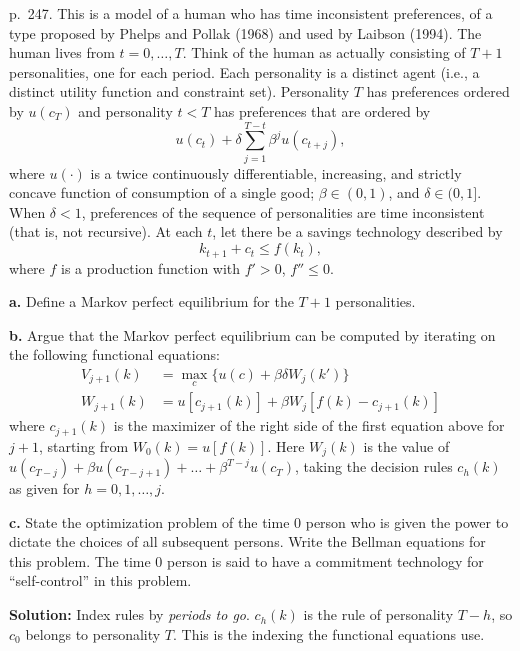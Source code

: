 \documentclass[12pt, letterpaper]{article}
\begin{document}
\begin{tcolorbox}[evenbox,title={Exercise 7.6 \quad Self-control}]
\begin{tcolorbox}[questionbox]
p.~247. This is a model of a human who has time inconsistent preferences, of a type proposed by
Phelps and Pollak (1968) and used by Laibson (1994). The human lives from $t=0,\dots,T$. Think of
the human as actually consisting of $T+1$ personalities, one for each period. Each personality is a
distinct agent (i.e., a distinct utility function and constraint set). Personality $T$ has
preferences ordered by $u(c_T)$ and personality $t<T$ has preferences that are ordered by
\[
u(c_t)+\delta\sum_{j=1}^{T-t}\beta^ju(c_{t+j}),
\]
where $u(\cdot)$ is a twice continuously differentiable, increasing, and strictly concave function
of consumption of a single good; $\beta\in(0,1)$, and $\delta\in(0,1]$. When $\delta<1$, preferences
of the sequence of personalities are time inconsistent (that is, not recursive). At each $t$, let
there be a savings technology described by
\[
k_{t+1}+c_t\le f(k_t),
\]
where $f$ is a production function with $f'>0$, $f''\le0$.

\textbf{a.} Define a Markov perfect equilibrium for the $T+1$ personalities.

\textbf{b.} Argue that the Markov perfect equilibrium can be computed by iterating on the following
functional equations:
\begin{align*}
V_{j+1}(k)&=\max_c\{u(c)+\beta\delta W_j(k')\}\\
W_{j+1}(k)&=u[c_{j+1}(k)]+\beta W_j[f(k)-c_{j+1}(k)]
\end{align*}
where $c_{j+1}(k)$ is the maximizer of the right side of the first equation above for $j+1$,
starting from $W_0(k)=u[f(k)]$. Here $W_j(k)$ is the value of
$u(c_{T-j})+\beta u(c_{T-j+1})+\dots+\beta^{T-j}u(c_T)$, taking the decision rules $c_h(k)$ as given
for $h=0,1,\dots,j$.

\textbf{c.} State the optimization problem of the time $0$ person who is given the power to dictate
the choices of all subsequent persons. Write the Bellman equations for this problem. The time $0$
person is said to have a commitment technology for ``self-control'' in this problem.
\end{tcolorbox}

\textbf{Solution:} Index rules by \emph{periods to go}. $c_h(k)$ is the rule of personality
$T-h$, so $c_0$ belongs to personality $T$. This is the indexing the functional equations use.


\end{tcolorbox}
\end{document}

